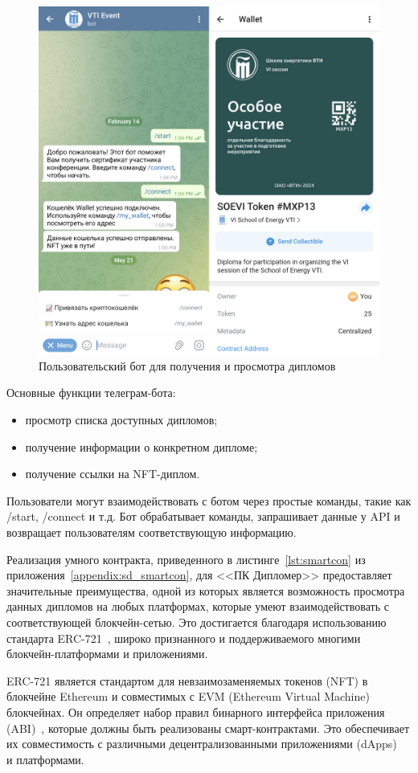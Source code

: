 \begin{figure}[H]
	\centering
	\includegraphics[width=.8\textwidth]{images/3.user_client.png}
	\parskip=6pt
	\caption{Пользовательский бот для получения и просмотра дипломов}
	\label{fig:user_client}
\end{figure}

Основные функции телеграм-бота:
\begin{itemize}
    \item просмотр списка доступных дипломов;
    \item получение информации о конкретном дипломе;
    \item получение ссылки на NFT-диплом.
\end{itemize}

Пользователи могут взаимодействовать с ботом через простые команды, такие как /start, /connect и т.д. Бот обрабатывает команды, запрашивает данные у API и возвращает пользователям соответствующую информацию.

Реализация умного контракта, приведенного в листинге~\ref{lst:smartcon} из приложения~\ref{appendix:sd_smartcon}, для <<ПК Дипломер>> предоставляет значительные преимущества, одной из которых является возможность просмотра данных дипломов на любых платформах, которые умеют взаимодействовать с соответствующей блокчейн-сетью. Это достигается благодаря использованию стандарта ERC-721~\cite{bib:erc721}, широко признанного и поддерживаемого многими блокчейн-платформами и приложениями.

ERC-721 является стандартом для невзаимозаменяемых токенов (NFT) в блокчейне Ethereum и совместимых с EVM (Ethereum Virtual Machine) блокчейнах. Он определяет набор правил бинарного интерфейса приложения (ABI)~\cite{bib:abi_is}, которые должны быть реализованы смарт-контрактами. Это обеспечивает их совместимость с различными децентрализованными приложениями (dApps)~\cite{bib:dapps} и платформами.

